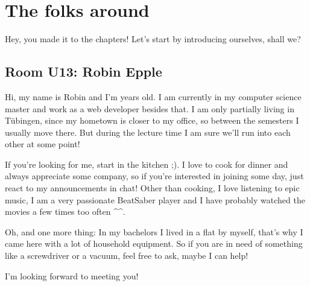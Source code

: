 \chapter{The folks around} \label{chap:introductions}
%
%
%

Hey, you made it to the chapters! Let's start by introducing ourselves, shall we?

\section{Room U13: Robin Epple} \label{sec:robinE}
%
\FPsub\result{\theCurrentDate}{\theBirthdate}
\FPdiv{}
\FPtrunc{}

Hi, my name is Robin and I'm \myage{} years old. I am currently in my computer science master and work as a web developer besides that. I am only partially living in Tübingen, since my hometown is closer to my office, so between the semesters I usually move there. But during the lecture time I am sure we'll run into each other at some point!

If you're looking for me, start in the kitchen ;). I love to cook for dinner and always appreciate some company, so if you're interested in joining some day, just react to my announcements in chat! Other than cooking, I love listening to epic music, I am a very passionate BeatSaber player and I have probably watched the  movies a few times too often \^{}\^{}.

Oh, and one more thing: In my bachelors I lived in a flat by myself, that's why I came here with a lot of household equipment. So if you are in need of something like a screwdriver or a vacuum, feel free to ask, maybe I can help!

I'm looking forward to meeting you!